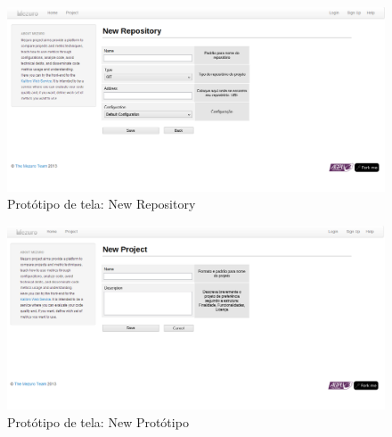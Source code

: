 \begin{figure}[H]
  \begin{center}
    \includegraphics[width=1\textwidth]{figuras/NewRepository.png}
    \caption{Protótipo de tela: New Repository}
    \label{fig:pNewRepository}
  \end{center}
\end{figure}

\begin{figure}[H]
  \begin{center}
    \includegraphics[width=1\textwidth]{figuras/NewProject.png}
    \caption{Protótipo de tela: New Protótipo}
    \label{fig:pNewPrototipo}
  \end{center}
\end{figure}